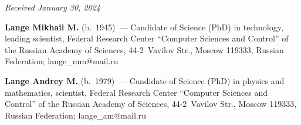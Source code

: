 \vspace*{-6pt}

\hfill{\small\textit{Received January 30, 2024}} 

\vspace*{-12pt}


\Contr

\vspace*{-3pt}

\noindent
\textbf{Lange Mikhail M.} (b.\ 1945)~--- Candidate of Science (PhD) in technology, leading scientist, Federal 
Research Center ``Computer Sciences and Control'' of the Russian Academy of Sciences, 44-2~Vavilov Str., 
Moscow 119333, Russian Federation; \mbox{lange\_mm@mail.ru}

\vspace*{3pt}

\noindent
\textbf{Lange Andrey M.} (b.\ 1979)~--- Candidate of Science (PhD) in physics and mathematics, scientist, 
Federal Research Center ``Computer Sciences and Control'' of the Russian Academy of Sciences, 44-2~Vavilov 
Str., Moscow 119333, Russian Federation; \mbox{lange\_am@mail.ru}





\label{end\stat}

\renewcommand{\bibname}{\protect\rm Литература} 